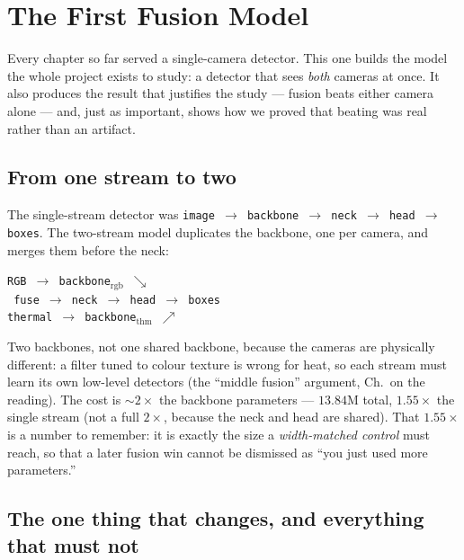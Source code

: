 \documentclass[../main.tex]{subfiles}
\begin{document}
\noindent{}\par\medskip

\chapter{The First Fusion Model}

Every chapter so far served a single-camera detector. This one builds the model the whole project
exists to study: a detector that sees \emph{both} cameras at once. It also produces the result that
justifies the study --- fusion beats either camera alone --- and, just as important, shows how we
proved that beating was real rather than an artifact.

\section{From one stream to two}

The single-stream detector was \texttt{image $\to$ backbone $\to$ neck $\to$ head $\to$ boxes}. The
two-stream model duplicates the backbone, one per camera, and merges them before the neck:

\begin{center}
\texttt{RGB $\to$ backbone$_\text{rgb}$ \quad$\searrow$}\\
\texttt{\hspace{4.2cm} fuse $\to$ neck $\to$ head $\to$ boxes}\\
\texttt{thermal $\to$ backbone$_\text{thm}$ \quad$\nearrow$}
\end{center}

Two backbones, not one shared backbone, because the cameras are physically different: a filter
tuned to colour texture is wrong for heat, so each stream must learn its own low-level detectors
(the ``middle fusion'' argument, Ch.~on the reading). The cost is $\sim2\times$ the backbone
parameters --- $13.84$M total, $1.55\times$ the single stream (not a full $2\times$, because the
neck and head are shared). That $1.55\times$ is a number to remember: it is exactly the size a
\emph{width-matched control} must reach, so that a later fusion win cannot be dismissed as ``you
just used more parameters.''

\section{The one thing that changes, and everything that must not}
\end{document}
